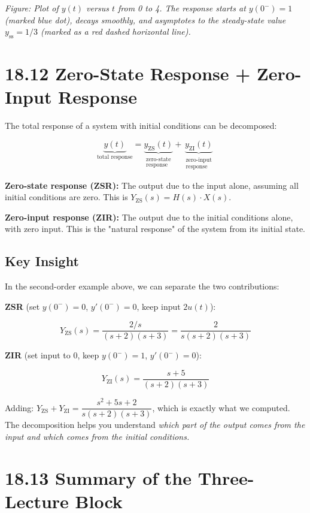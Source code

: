 \documentclass[11pt]{article}
\begin{document}
\textit{Figure: Plot of $y(t)$ versus $t$ from 0 to 4. The response starts at $y(0^-) = 1$ (marked blue dot), decays smoothly, and asymptotes to the steady-state value $y_{\text{ss}} = 1/3$ (marked as a red dashed horizontal line).}

\section*{18.12 Zero-State Response + Zero-Input Response}

The total response of a system with initial conditions can be decomposed:

\[\underbrace{y(t)}_{\text{total response}} = \underbrace{y_{\text{ZS}}(t)}_{\substack{\text{zero-state} \\ \text{response}}} + \underbrace{y_{\text{ZI}}(t)}_{\substack{\text{zero-input} \\ \text{response}}}\]

\textbf{Zero-state response (ZSR):} The output due to the input alone, assuming all initial conditions are zero. This is $Y_{\text{ZS}}(s) = H(s) \cdot X(s)$.

\textbf{Zero-input response (ZIR):} The output due to the initial conditions alone, with zero input. This is the "natural response" of the system from its initial state.

\subsection*{Key Insight}

In the second-order example above, we can separate the two contributions:

\textbf{ZSR} (set $y(0^-) = 0$, $y'(0^-) = 0$, keep input $2u(t)$):

\[Y_{\text{ZS}}(s) = \frac{2/s}{(s+2)(s+3)} = \frac{2}{s(s+2)(s+3)}\]

\textbf{ZIR} (set input to 0, keep $y(0^-) = 1$, $y'(0^-) = 0$):

\[Y_{\text{ZI}}(s) = \frac{s+5}{(s+2)(s+3)}\]

Adding: $Y_{\text{ZS}} + Y_{\text{ZI}} = \dfrac{s^2 + 5s + 2}{s(s+2)(s+3)}$, which is exactly what we computed. The decomposition helps you understand \textit{which part of the output comes from the input and which comes from the initial conditions.}

\section*{18.13 Summary of the Three-Lecture Block}
\end{document}
